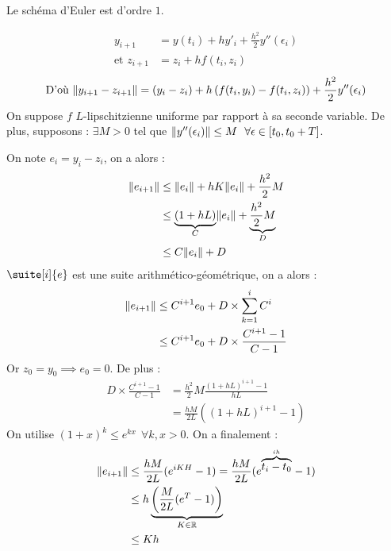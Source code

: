 		\begin{propShort}
			Le schéma d'Euler est d'ordre $1$.
		\end{propShort}
		\begin{preuve}
			\begin{align*}
				y_{i+1} 			&= y(t_i) + hy'_i + \frac{h^2}{2}y''(\epsilon_i)	\\
				\text {et } z_{i+1} 	&= z_i + hf(t_i, z_i)
			\end{align*}
			$$
				\text{D'où } \lVert y_{i+1} - z_{i+1} \rVert = (y_i -z_i) + h \left( f(t_i,y_i) -f(t_i, z_i) \right) + \frac{h^2}{2}y''(\epsilon_i)
			$$
			On suppose $f$ $L$-lipschitzienne uniforme par rapport à sa seconde variable.
			De plus, supposons : $\exists M > 0$ tel que $\lVert y''(\epsilon_i) \rVert\leq M ~~\forall\epsilon\in [t_0, t_0 + T] $.

			On note $e_i = y_i - z_i$, on a alors :
			\begin{align*}
				\lVert e_{i+1} \rVert	&\leq \lVert e_i \rVert + hK\lVert e_i \rVert + \frac{h^2}{2}M	\\
								&\leq \underbrace{(1 + hL)}_{C} \lVert e_i \rVert + \underbrace{\frac{h^2}{2}M}_{D}			\\
								&\leq C \lVert e_i \rVert + D
			\end{align*}
			$\suite[i]{e}$ est une suite arithmético-géométrique, on a alors :
			\begin{align*}
				\lVert e_{i+1} \rVert	&\leq C^{i+1}e_0 + D\times \sum_{k=1}^i C^i			\\
								&\leq C^{i+1}e_0 + D\times \frac{C^{i+1} - 1}{C-1}	\\
			\end{align*}
			Or $z_0 = y_0 \implies e_0 = 0$. De plus :		
			\begin{align*}
				D\times \frac{C^{i+1} - 1}{C-1}	&= \frac{h^2}{2} M \frac{(1+hL)^{i+1} -1}{hL}	\\
												&= \frac{hM}{2L} \left( (1+hL)^{i+1} -1 \right)
			\end{align*}
			On utilise $(1+x)^k \leq e^{kx} ~~\forall k,x>0$. On a finalement :
			\begin{align*}
				\lVert e_{i+1} \rVert	&\leq \frac{hM}{2L}(e^{iKH} -1) = \frac{hM}{2L}(e^{\overbrace{t_i-t_0}^{ih}} -1)	\\
								&\leq h \underbrace{\left( \frac{M}{2L}(e^T-1) \right)}_{K \in \mathbb{R}}				\\
								&\leq Kh
			\end{align*}
		\end{preuve}

